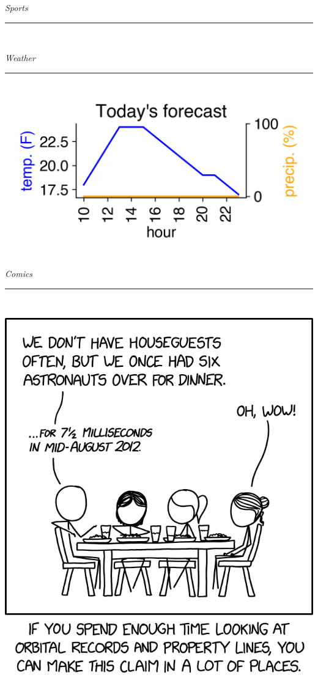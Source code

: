 \documentclass{article}
\date{\today}
\renewcommand\headline[1]{\begin{center} {\huge \textsl{ #1}}\\ %
			\rule[5pt]{0.8\hsize}{0.5pt}\\ \end{center}}
\begin{document}
\maketitle

\begin{multicols}{3}

\headline{Sports}
\lipsum[1]

\headline{Weather}
\center\includegraphics[width=\linewidth]{images/forecast.png}

\headline{Comics}
\center\includegraphics[width=\linewidth]{images/comic.png}


\end{multicols}
\end{document}
